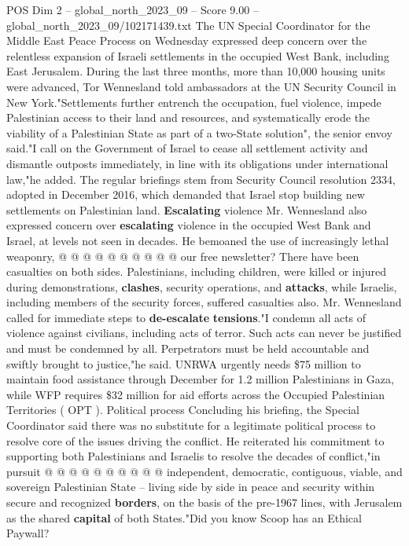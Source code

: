 \begin{textsample}{POS Dim 2 – global\_north\_2023\_09 – Score 9.00 – global\_north\_2023\_09/102171439.txt}  \label{ex:f2_pos_137}
The UN Special Coordinator for the Middle East Peace Process on Wednesday expressed deep concern over the relentless expansion of Israeli settlements in the occupied West Bank, including East Jerusalem.
During the last three months, more than 10,000 housing units were advanced, Tor Wennesland told ambassadors at the UN Security Council in New York."Settlements further entrench the occupation, fuel violence, impede Palestinian access to their land and resources, and systematically erode the viability of a Palestinian State as part of a two-State solution", the senior envoy said."I call on the Government of Israel to cease all settlement activity and dismantle outposts immediately, in line with its obligations under international law,"he added.
The regular briefings stem from Security Council resolution 2334, adopted in December 2016, which demanded that Israel stop building new settlements on Palestinian land. \textbf{Escalating} violence Mr.
Wennesland also expressed concern over \textbf{escalating} violence in the occupied West Bank and Israel, at levels not seen in decades.
He bemoaned the use of increasingly lethal weaponry, @ @ @ @ @ @ @ @ @ @ our free newsletter?
There have been casualties on both sides.
Palestinians, including children, were killed or injured during demonstrations, \textbf{clashes}, security operations, and \textbf{attacks}, while Israelis, including members of the security forces, suffered casualties also.
Mr.
Wennesland called for immediate steps to \textbf{de-escalate} \textbf{tensions}."I condemn all acts of violence against civilians, including acts of terror.
Such acts can never be justified and must be condemned by all.
Perpetrators must be held accountable and swiftly brought to justice,"he said.
UNRWA urgently needs \$75 million to maintain food assistance through December for 1.2 million Palestinians in Gaza, while WFP requires \$32 million for aid efforts across the Occupied Palestinian Territories ( OPT ).
Political process Concluding his briefing, the Special Coordinator said there was no substitute for a legitimate political process to resolve core of the issues driving the conflict.
He reiterated his commitment to supporting both Palestinians and Israelis to resolve the decades of conflict,"in pursuit @ @ @ @ @ @ @ @ @ @ independent, democratic, contiguous, viable, and sovereign Palestinian State -- living side by side in peace and security within secure and recognized \textbf{borders}, on the basis of the pre-1967 lines, with Jerusalem as the shared \textbf{capital} of both States."Did you know Scoop has an Ethical Paywall?

\end{textsample}
